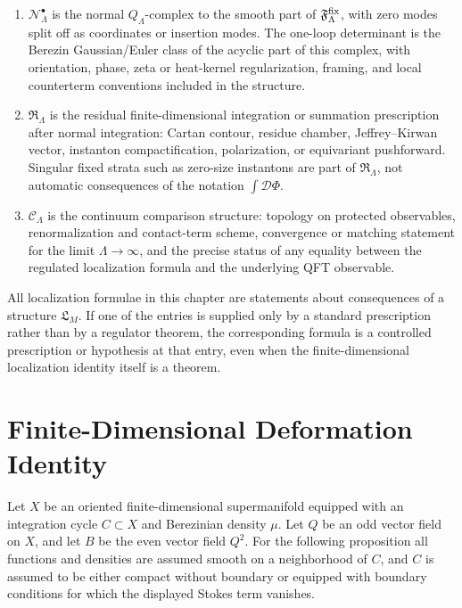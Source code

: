 \begin{definition}
\begin{enumerate}[label=(\roman*)]
\(\operatorname{Re}(Q_\Lambda V_\Lambda)\ge 0\) on the bosonic body of
\(C_\Lambda\), with equality precisely on a stated fixed locus
\(\mathfrak F^{\rm fix}_\Lambda\).  The \(Q_\Lambda\)-Stokes boundary term
\[
  \int_{\partial C_\Lambda}
  \mu_\Lambda\,\mathcal O_\Lambda V_\Lambda
  \exp\{-S_\Lambda-tQ_\Lambda V_\Lambda\}
\]
is either proved to vanish, canceled by a declared relative-cycle or boundary
counterterm, or recorded as an open obstruction.
\item \(\mathcal N_\Lambda^\bullet\) is the normal \(Q_\Lambda\)-complex to
the smooth part of \(\mathfrak F^{\rm fix}_\Lambda\), with zero modes split
off as coordinates or insertion modes.  The one-loop determinant is the
Berezin Gaussian/Euler class of the acyclic part of this complex, with
orientation, phase, zeta or heat-kernel regularization, framing, and local
counterterm conventions included in the structure.
\item \(\mathfrak R_\Lambda\) is the residual finite-dimensional integration
or summation prescription after normal integration: Cartan contour, residue
chamber, Jeffrey--Kirwan vector, instanton compactification, polarization,
or equivariant pushforward.  Singular fixed strata such as zero-size
instantons are part of \(\mathfrak R_\Lambda\), not automatic consequences of
the notation \(\int\mathcal D\Phi\).
\item \(\mathcal C_\Lambda\) is the continuum comparison structure: topology on
protected observables, renormalization and contact-term scheme, convergence
or matching statement for the limit \(\Lambda\to\infty\), and the precise
status of any equality between the regulated localization formula and the
underlying QFT observable.
\end{enumerate}
All localization formulae in this chapter are statements about consequences
of a structure \(\mathfrak L_M\).  If one of the entries is supplied only by a
standard prescription rather than by a regulator theorem, the corresponding
formula is a controlled prescription or hypothesis at that entry, even when
the finite-dimensional localization identity itself is a theorem.
\end{definition}

\section{Finite-Dimensional Deformation Identity}

Let \(X\) be an oriented finite-dimensional supermanifold equipped with an
integration cycle \(C\subset X\) and Berezinian density \(\mu\).  Let \(Q\) be
an odd vector field on \(X\), and let \(B\) be the even vector field \(Q^2\).
For the following proposition all functions and densities are assumed smooth
on a neighborhood of \(C\), and \(C\) is assumed to be either compact without
boundary or equipped with boundary conditions for which the displayed
Stokes term vanishes.

